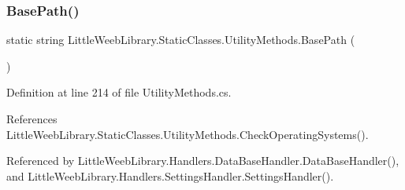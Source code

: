 \subsubsection{\texorpdfstring{Base\+Path()}{BasePath()}}
{\footnotesize\ttfamily static string Little\+Weeb\+Library.\+Static\+Classes.\+Utility\+Methods.\+Base\+Path (\begin{DoxyParamCaption}{ }\end{DoxyParamCaption})\hspace{0.3cm}{\ttfamily [static]}}



Definition at line 214 of file Utility\+Methods.\+cs.



References Little\+Weeb\+Library.\+Static\+Classes.\+Utility\+Methods.\+Check\+Operating\+Systems().



Referenced by Little\+Weeb\+Library.\+Handlers.\+Data\+Base\+Handler.\+Data\+Base\+Handler(), and Little\+Weeb\+Library.\+Handlers.\+Settings\+Handler.\+Settings\+Handler().


